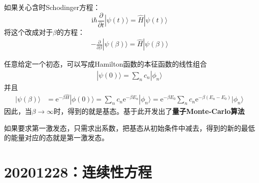 \documentclass[12pt]{article}
\begin{document}
    如果关心含时Schodinger方程：
    \begin{equation}
        \mathrm{i}\hbar \frac {\partial}{\partial t} | \psi(t) \rangle = \hat{H}|\psi(t) \rangle
    \end{equation}
    将这个改成对于$\beta$的方程：
    \begin{equation}\begin{aligned}
        -\frac {\partial}{\partial \beta} |\psi(\beta) \rangle = \hat{H} |\psi(\beta) \rangle
    \end{aligned}\end{equation}

    任意给定一个初态，可以写成Hamilton函数的本征函数的线性组合
    \begin{equation}\begin{aligned}
        |\psi(0) \rangle = \sum_n c_n |\phi_n\rangle
    \end{aligned}\end{equation}
    并且
    \begin{equation}\begin{aligned}
        |\psi(\beta) \rangle &= \mathrm{e}^{-\beta \hat{H}} |\phi(0) \rangle = \sum_n c_n\mathrm{e}^{-\beta E_n}|\phi_n \rangle = \mathrm{e}^{-\beta E_0} \sum_n c_n \mathrm{e}^{-\beta(E_n-E_0)} |\phi_n \rangle
    \end{aligned}\end{equation}
    因此，当$\beta \to \infty$时，得到的就是基态。基于此开发出了\textbf{量子Monte-Carlo算法}

    如果要求第一激发态，只需求出系数，把基态从初始条件中减去，得到的新的最低的能量对应的态就是第一激发态。

\section{20201228：连续性方程}
\end{document}
